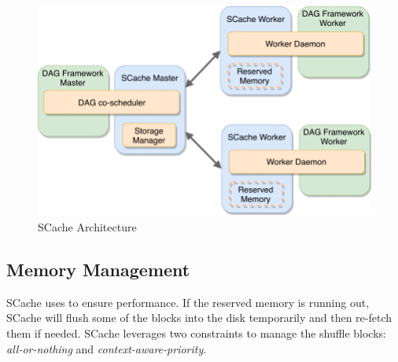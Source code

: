 

\begin{figure}
	\centering
	\includegraphics[width=.8\linewidth]{fig/architecture}
	\caption{\color{black}SCache Architecture}
	\label{fig:architecture}
\end{figure}

\subsection{Memory Management}\label{memorymanage}
{\color{black}
SCache uses  to ensure performance.
If the reserved memory is running out, SCache will flush some of the blocks into the disk temporarily and then re-fetch them if needed.
SCache leverages two constraints to manage the shuffle blocks: \textit{all-or-nothing} and \textit{context-aware-priority}.
}

